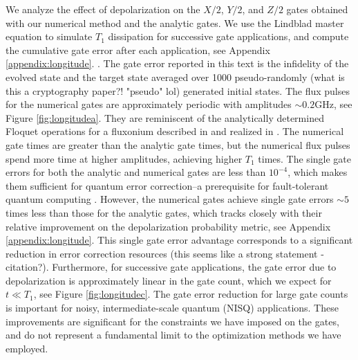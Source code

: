We analyze the effect of depolarization on
the $X/2$, $Y/2$, and $Z/2$ gates obtained with
our numerical method and the analytic gates. We
use the Lindblad master equation to simulate $T_{1}$ dissipation for successive
gate applications, and compute the cumulative gate error
after each application, see Appendix \ref{appendix:longitude}.
.
The gate error reported in this text is the infidelity
of the evolved state and the target state averaged over 1000 pseudo-randomly (what is this a cryptography paper?! "pseudo" lol)
generated initial states.
The flux pulses for the numerical gates
are approximately periodic
with amplitudes $\sim 0.2 \textrm{GHz}$, see Figure \ref{fig:longitudea}.
They are reminiscent of the analytically determined Floquet operations
for a fluxonium described in \cite{huang2020engineering}
and realized in \cite{mundada2020floquet}.
The numerical gate times are greater
than the analytic gate times, but the
numerical flux pulses
spend more time at higher amplitudes, achieving higher $T_{1}$ times.
The single gate errors for both the analytic and numerical gates are
less than $10^{-4}$, which makes them sufficient for quantum error correction--a
prerequisite for fault-tolerant quantum
computing \cite{aharonov2008fault, knill2005quantum, gottesman1997stabilizer}.
However, the numerical gates achieve single gate errors
$\sim 5$ times less than those for the analytic gates,
which tracks closely with their relative improvement
on the depolarization probability metric, see Appendix \ref{appendix:longitude}.
This single gate error advantage corresponds to a significant reduction in error correction resources (this seems like a strong statement - citation?).
Furthermore, for successive gate applications, the gate error due to depolarization is approximately linear
in the gate count, which we expect for $t \ll T_{1}$, see Figure \ref{fig:longitudec}.
The gate error reduction for large gate counts is important for noisy, intermediate-scale quantum (NISQ)
applications. These improvements are significant for the constraints we have imposed on the gates,
and do not represent a fundamental limit to the optimization methods we have employed.


